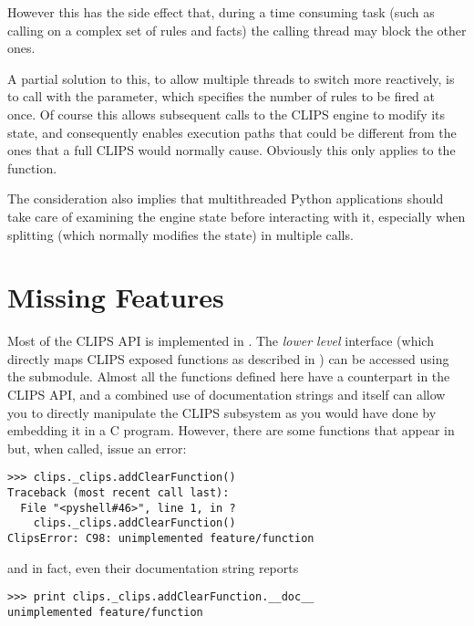 However this has the side effect that, during a time consuming task
(such as calling  on a complex set of rules and facts)
the calling thread may block the other ones.

A partial solution to this, to allow multiple threads to switch more
reactively, is to call  with the  parameter,
which specifies the number of rules to be fired at once. Of course this
allows subsequent calls to the CLIPS engine to modify its state, and
consequently enables execution paths that could be different from the
ones that a full CLIPS  would normally cause. Obviously
this only applies to the  function.

The consideration also implies that multithreaded Python applications
should take care of examining the engine state before interacting with
it, especially when splitting  (which normally modifies
the state) in multiple calls.



\chapter{Missing Features\label{pyclips-missing}}

Most of the CLIPS API is implemented in \pyclips{}. The \emph{lower
level} interface (which directly maps CLIPS exposed functions as
described in \clipsapg{}) can be accessed using the
 submodule. Almost all the functions defined here
have a counterpart in the CLIPS API, and a combined use of documentation
strings and \clipsapg{} itself can allow you to directly manipulate the
CLIPS subsystem as you would have done by embedding it in a C program.
However, there are some functions that appear in 
but, when called, issue an error:

\begin{verbatim}
>>> clips._clips.addClearFunction()
Traceback (most recent call last):
  File "<pyshell#46>", line 1, in ?
    clips._clips.addClearFunction()
ClipsError: C98: unimplemented feature/function
\end{verbatim}

and in fact, even their documentation string reports

\begin{verbatim}
>>> print clips._clips.addClearFunction.__doc__
unimplemented feature/function
\end{verbatim}

